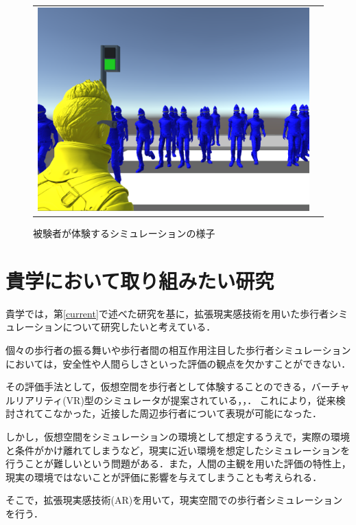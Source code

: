 \documentclass[twocolumn]{jarticle}%
\begin{document}
\begin{figure}[H]
\begin{tabular}{cc}
\begin{minipage}[t]{0.45\hsize}
        \includegraphics[keepaspectratio, scale=0.1]{images/user_view_mini.JPG}
        \caption{被験者が体験するシミュレーションの様子}
        \label{fig:user_view}
      \end{minipage}
    \end{tabular}
  \end{figure}

\section{貴学において取り組みたい研究}\label{want}
貴学では，第\ref{current}で述べた研究を基に，拡張現実感技術を用いた歩行者シミュレーションについて研究したいと考えている．

個々の歩行者の振る舞いや歩行者間の相互作用注目した歩行者シミュレーションにおいては，安全性や人間らしさといった評価の観点を欠かすことができない．

その評価手法として，仮想空間を歩行者として体験することのできる，バーチャルリアリティ(VR)型のシミュレータが提案されている\cite{Iryo-1}，\cite{Iryo-2}，\cite{Iryo-3}．
これにより，従来検討されてこなかった，近接した周辺歩行者について表現が可能になった．

しかし，仮想空間をシミュレーションの環境として想定するうえで，実際の環境と条件がかけ離れてしまうなど，現実に近い環境を想定したシミュレーションを行うことが難しいという問題がある．また，人間の主観を用いた評価の特性上，現実の環境ではないことが評価に影響を与えてしまうことも考えられる．

そこで，拡張現実感技術(AR)を用いて，現実空間での歩行者シミュレーションを行う．
\end{document}
